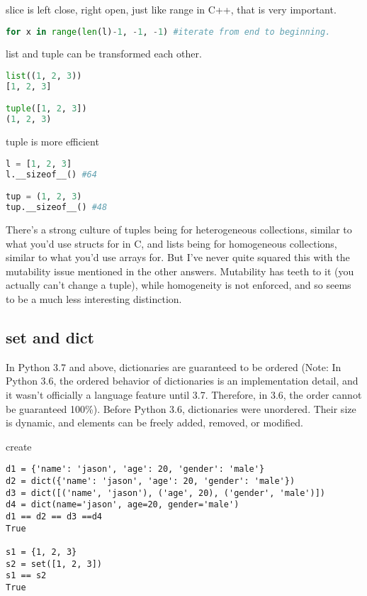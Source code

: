 \documentclass[a4paper,12pt,twoside]{book}
\begin{document}
slice is left close, right open, just like range in C++, that is very important.
\begin{lstlisting}[frame=single, language=Python]
for x in range(len(l)-1, -1, -1) #iterate from end to beginning.
\end{lstlisting}  

list and tuple can be transformed each other.
\begin{lstlisting}[frame=single, language=Python]
list((1, 2, 3))
[1, 2, 3]

tuple([1, 2, 3])
(1, 2, 3)
\end{lstlisting}  

tuple is more efficient 
\begin{lstlisting}[frame=single, language=Python]
l = [1, 2, 3]
l.__sizeof__() #64

tup = (1, 2, 3)
tup.__sizeof__() #48
\end{lstlisting}  

There's a strong culture of tuples being for heterogeneous collections, similar to what you'd use structs for in C, and lists being for homogeneous collections, similar to what you'd use arrays for. But I've never quite squared this with the mutability issue mentioned in the other answers. Mutability has teeth to it (you actually can't change a tuple), while homogeneity is not enforced, and so seems to be a much less interesting distinction.

\subsection{set and dict}

In Python 3.7 and above, dictionaries are guaranteed to be ordered (Note: In Python 3.6, the ordered behavior of dictionaries is an implementation detail, and it wasn’t officially a language feature until 3.7. Therefore, in 3.6, the order cannot be guaranteed 100\%). Before Python 3.6, dictionaries were unordered. Their size is dynamic, and elements can be freely added, removed, or modified.

create 
\begin{lstlisting}
d1 = {'name': 'jason', 'age': 20, 'gender': 'male'}
d2 = dict({'name': 'jason', 'age': 20, 'gender': 'male'})
d3 = dict([('name', 'jason'), ('age', 20), ('gender', 'male')])
d4 = dict(name='jason', age=20, gender='male') 
d1 == d2 == d3 ==d4
True

s1 = {1, 2, 3}
s2 = set([1, 2, 3])
s1 == s2
True
\end{lstlisting}
\end{document}
